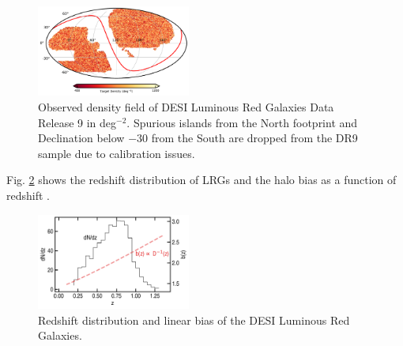 \begin{figure}
    \centering
    \includegraphics[width=0.45\textwidth]{figures/lrgdens.pdf}
    \caption{Observed density field of DESI Luminous Red Galaxies Data Release 9 in deg$^{-2}$. Spurious islands from the North footprint and Declination below $-30$ from the South are dropped from the DR9 sample due to calibration issues.}
    \label{fig:ng}
\end{figure}

Fig. \ref{fig:nz} shows the redshift distribution of LRGs and the halo bias as a function of redshift . 
\begin{figure}
    \centering
    \includegraphics[width=0.45\textwidth]{figures/nz_lrg.pdf}
    \caption{Redshift distribution and linear bias of the DESI Luminous Red Galaxies.}
    \label{fig:nz}
\end{figure}


